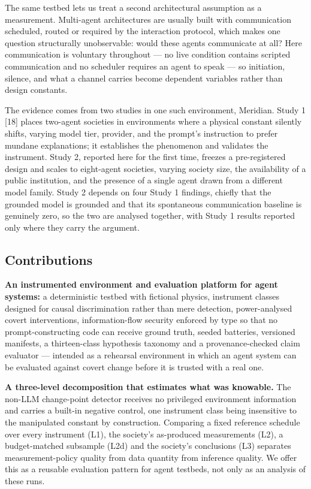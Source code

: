 \documentclass[pdflatex,sn-basic]{sn-jnl}
\begin{document}
The same testbed lets us treat a second architectural assumption as a measurement. Multi-agent
architectures are usually built with communication scheduled, routed or required by the
interaction protocol, which makes one question structurally unobservable: would these agents
communicate at all? Here communication is voluntary throughout --- no live condition contains
scripted communication and no scheduler requires an agent to speak --- so initiation, silence,
and what a channel carries become dependent variables rather than design constants.

The evidence comes from two studies in one such environment, Meridian. Study 1 {[}18{]} places
two-agent societies in environments where a physical constant silently shifts, varying model
tier, provider, and the prompt's instruction to prefer mundane explanations; it establishes
the phenomenon and validates the instrument. Study 2, reported here for the first time,
freezes a pre-registered design and scales to eight-agent societies, varying society size, the
availability of a public institution, and the presence of a single agent drawn from a
different model family. Study 2 depends on four Study 1 findings, chiefly that the grounded
model is grounded and that its spontaneous communication baseline is genuinely zero, so the
two are analysed together, with Study 1 results reported only where they carry the argument.

\hypertarget{contributions}{%
\subsection{Contributions}\label{contributions}}

\textbf{An instrumented environment and evaluation platform for agent systems:} a deterministic
testbed with fictional physics, instrument classes designed for causal discrimination rather
than mere detection, power-analysed covert interventions, information-flow security enforced
by type so that no prompt-constructing code can receive ground truth, seeded batteries,
versioned manifests, a thirteen-class hypothesis taxonomy and a provenance-checked claim
evaluator --- intended as a rehearsal environment in which an agent system can be evaluated
against covert change before it is trusted with a real one.

\textbf{A three-level decomposition that estimates what was knowable.} The non-LLM change-point
detector receives no privileged environment information and carries a built-in negative
control, one instrument class being insensitive to the manipulated constant by construction.
Comparing a fixed reference schedule over every instrument (L1), the society's as-produced
measurements (L2), a budget-matched subsample (L2d) and the society's conclusions (L3)
separates measurement-policy quality from data quantity from inference quality. We offer this
as a reusable evaluation pattern for agent testbeds, not only as an analysis of these runs.
\end{document}
